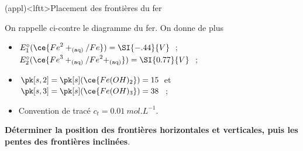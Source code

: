 \documentclass[../../main/main.tex]{subfiles}
\begin{document}
\begin{tcb*}[breakable](appl)<lftt>{Placement des frontières du fer}
	\noindent
	\begin{minipage}[c]{.67\linewidth}
		On rappelle ci-contre le diagramme du fer. On donne de plus
		\begin{itemize}
			\item $E_1^\circ(\ce{{Fe}^2+_{\rm(aq)}/Fe}) = \SI{-.44}{V}$~;
			      $E_2^\circ(\ce{{Fe}^3+_{\rm(aq)}/{Fe}^2+_{\rm(aq)}}) = \SI{0.77}{V}$~;
			\item $\pk[s,2] = \pk[s](\ce{Fe(OH)_2}) = 15$ et $\pk[s,3] =
				      \pk[s](\ce{Fe(OH)_3}) = 38$~;
			\item Convention de tracé $c_t = \SI{0.01}{mol.L^{-1}}$.
		\end{itemize}
		\textbf{Déterminer la position des frontières horizontales et verticales,
			puis les pentes des frontières inclinées}.
	\end{minipage}
	\begin{minipage}[c]{.30\linewidth}
		\vspace{0pt}
		\begin{center}
\end{center}
\end{minipage}
\end{tcb*}
\end{document}
